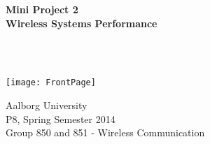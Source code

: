 \begin{center}
	\vspace*{1.5cm}
	
	\begin{Huge}
		\textbf{Mini Project 2\\
		Wireless Systems Performance}
	\end{Huge}\\~\\
	
	\vspace*{2cm}
	
	\texttt{[image: FrontPage]}
	\vspace*{2cm}
    
	Aalborg University\\
	P8, Spring Semester 2014\\
	Group 850 and 851 - Wireless Communication \\
\end{center}